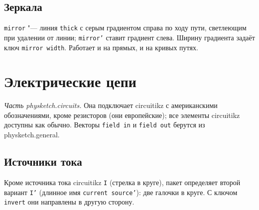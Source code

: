 \documentclass[a4paper,11pt]{article}
\newcommand\pkg[1]{\textsf{#1}}
\newcommand\key[1]{\texttt{#1}}
\begin{document}
\subsection{Зеркала}
\key{mirror} "--- линия \key{thick} с серым градиентом справа по ходу пути,
светлеющим при удалении от линии; \key{mirror'} ставит градиент слева.
Ширину градиента задаёт ключ \key{mirror width}. Работает и на прямых, и на
кривых путях.
\begin{example}
\end{example}

\section{Электрические цепи}
\emph{Часть \pkg{physketch.circuits}.} Она подключает \pkg{circuitikz} с
американскими обозначениями, кроме резисторов (они европейские); все
элементы \pkg{circuitikz} доступны как обычно. Векторы \texttt{field in} и
\texttt{field out} берутся из \pkg{physketch.general}.
\begin{example}
\end{example}

\subsection{Источники тока}
Кроме источника тока \pkg{circuitikz} \key{I} (стрелка в круге), пакет
определяет второй вариант \key{I'} (длинное имя \key{current source'}): две
галочки в круге. С ключом \key{invert} они направлены в другую сторону.
\begin{example}
\end{example}
\end{document}
